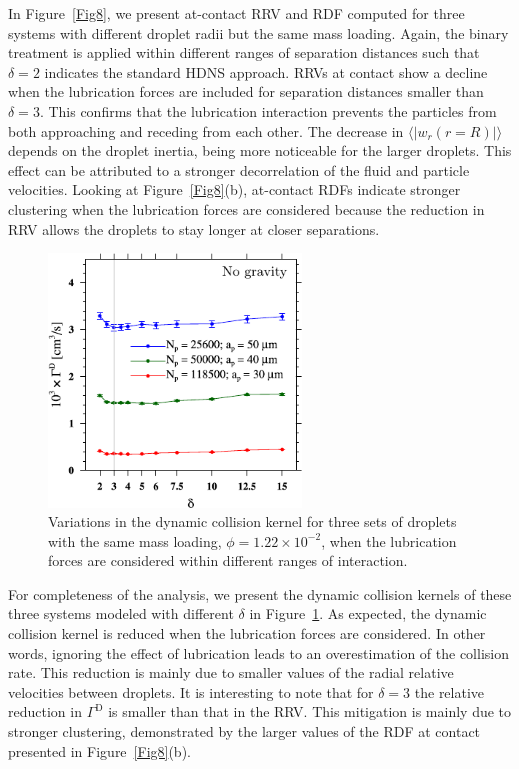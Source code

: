 \documentclass[../thesis.tex]{subfiles}
\begin{document}
In Figure~\ref{Fig8}, we present at-contact RRV and RDF computed for three systems with different droplet radii but the same mass loading. Again, the binary treatment is applied within different ranges of separation distances such that $\delta=2$ indicates the standard HDNS approach. RRVs at contact show a decline when the lubrication forces are included for separation distances smaller than $\delta=3$. This confirms that the lubrication interaction prevents the particles from both approaching and receding from each other. The decrease in $\langle |w_r(r=R)| \rangle$ depends on the droplet inertia, being more noticeable for the larger droplets. This effect can be attributed to a stronger decorrelation of the fluid and particle velocities. Looking at Figure~\ref{Fig8}(b), at-contact RDFs indicate stronger clustering when the lubrication forces are considered because the reduction in RRV allows the droplets to stay longer at closer separations.

\begin{figure}%
\center
\includegraphics[width=0.6\textwidth]{../figs/JFM/fig9.pdf}
\caption{Variations in the dynamic collision kernel for three sets of droplets with the same mass loading, $\phi = 1.22\times10^{-2}$, when the lubrication forces are considered within different ranges of interaction.}
\label{Fig9}
\end{figure}%

For completeness of the analysis, we present the dynamic collision kernels of these three systems modeled with different $\delta$ in Figure~\ref{Fig9}. As expected, the dynamic collision kernel is reduced when the lubrication forces are considered. In other words, ignoring the effect of lubrication leads to an overestimation of the collision rate. This reduction is mainly due to smaller values of the radial relative velocities between droplets. It is interesting to note that for $\delta=3$ the relative reduction in $\Gamma^\text{D}$ is smaller than that in the RRV. This mitigation is mainly due to stronger clustering, demonstrated by the larger values of the RDF at contact presented in Figure~\ref{Fig8}(b).
\end{document}
